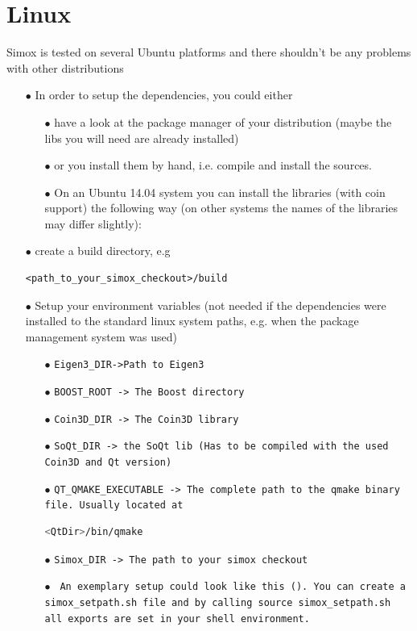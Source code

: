 \section{Linux}
Simox is tested on several Ubuntu platforms and there shouldn't be any problems with other distributions 
\begin{itemize}

\item[$\bullet$] In order to setup the dependencies, you could either 
\begin{itemize}
\item[$\bullet$] have a look at the package manager of your distribution (maybe the libs you will need are already installed) 
\item[$\bullet$] or you install them by hand, i.e. compile and install the sources.  
\item[$\bullet$] On an Ubuntu 14.04 system you can install the libraries (with coin support) the following way (on other systems the names of the libraries may differ slightly):
\end{itemize}
\item[$\bullet$] create a build directory, e.g \begin{lstlisting}
<path_to_your_simox_checkout>/build
\end{lstlisting}
\item[$\bullet$] Setup your environment variables (not needed if the dependencies were installed to the standard linux system paths, e.g. when the package management system was used) 
\begin{itemize}
\item[$\bullet$] \texttt{Eigen3\_DIR->Path to Eigen3}
\item[$\bullet$] \texttt{BOOST\_ROOT -> The Boost directory }
\item[$\bullet$] \texttt{Coin3D\_DIR -> The Coin3D library  }
\item[$\bullet$] \texttt{SoQt\_DIR -> the SoQt lib (Has to be compiled with the used Coin3D and Qt version)  }
\item[$\bullet$] \texttt{QT\_QMAKE\_EXECUTABLE -> The complete path to the qmake binary file. Usually located at } \begin{lstlisting}[language=bash]
<QtDir>/bin/qmake
\end{lstlisting}
\item[$\bullet$] \texttt{Simox\_DIR -> The path to your simox checkout }
\item[$\bullet$] \texttt{ An exemplary setup could look like this (\textbf{}). You can create a simox\_setpath.sh file and by calling source simox\_setpath.sh all exports are set in your shell environment. }


\end{itemize}
\end{itemize}
